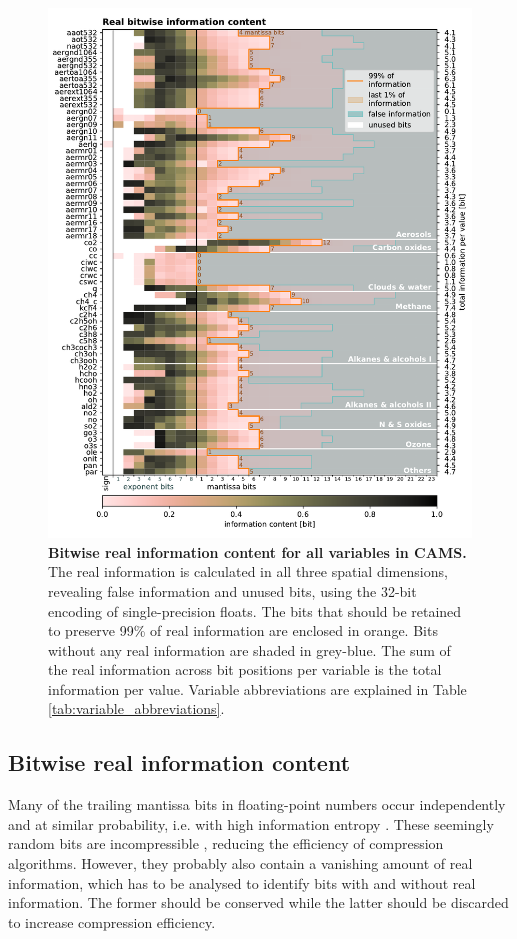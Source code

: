 \begin{figure}[tbhp]
	\includegraphics[width=1\textwidth]{Figures/compression/bitinformation.pdf}
	\caption{\textbf{Bitwise real information content for all variables in CAMS.} 
	The real information is calculated in all three spatial dimensions, revealing false information
	and unused bits, using the 32-bit encoding of single-precision floats. The bits that should be
	retained to preserve 99\% of real information are enclosed in orange. Bits without any real
	information are shaded in grey-blue. The sum of the real information across bit positions
	per variable is the total information per value. Variable abbreviations are explained in Table
	\ref{tab:variable_abbreviations}.}
	\label{fig:bitinformation}
\end{figure}

\subsection{Bitwise real information content}

Many of the trailing mantissa bits in floating-point numbers occur independently and at similar probability,
i.e. with high information entropy \citep{Kleeman2011,Jeffress2017}. These seemingly random bits are
incompressible \citep{MacKay2003a,Ziv1977,Huffman1952}, reducing
the efficiency of compression algorithms. However, they probably also contain a vanishing amount of real
information, which has to be analysed to identify bits with and without real information. The former should
be conserved while the latter should be discarded to increase compression efficiency.

